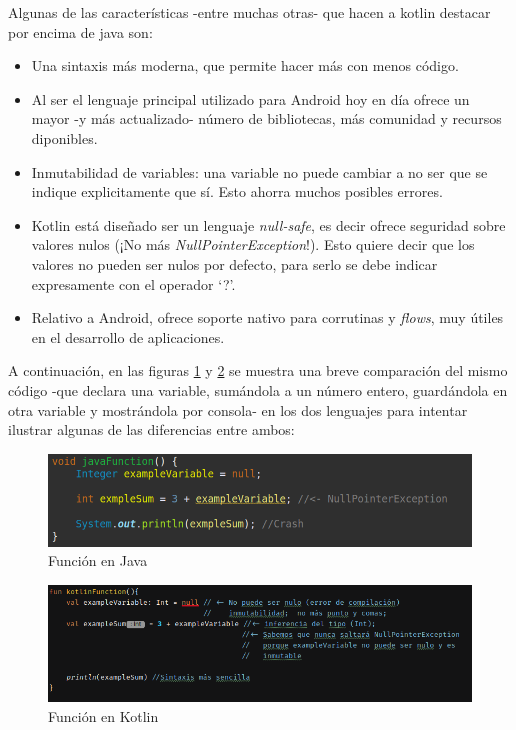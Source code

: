 Algunas de las características -entre muchas otras- que hacen a kotlin destacar por encima de java son:
\begin{itemize}
    \item Una sintaxis más moderna, que permite hacer más con menos código.
    \item Al ser el lenguaje principal utilizado para Android hoy en día ofrece un mayor -y más actualizado- número de bibliotecas, más comunidad y recursos diponibles.
    \item Inmutabilidad de variables: una variable no puede cambiar a no ser que se indique explicitamente que sí. Esto ahorra muchos posibles errores.
    \item Kotlin está diseñado ser un lenguaje \textit{null-safe}, es decir ofrece seguridad sobre valores nulos (¡No más \textit{NullPointerException}!). Esto quiere decir que los valores no pueden ser nulos por defecto, para serlo se debe indicar expresamente con el operador ‘?’.
    \item Relativo a Android, ofrece soporte nativo para corrutinas y \textit{flows}, muy útiles en el desarrollo de aplicaciones.
\end{itemize}
A continuación, en las figuras \ref{fig:javaFun} y \ref{fig:kotlinFun} se muestra una breve comparación del mismo código -que declara una variable, sumándola a un número entero, guardándola en otra variable y mostrándola por consola- en los dos lenguajes para intentar ilustrar algunas de las diferencias entre ambos:
\begin{figure}[h]
	\centering
	\includegraphics[width = 1\textwidth]{Imagenes/Fuentes/javaFun.png}
	\caption{Función en Java}
	\label{fig:javaFun}
\end{figure}
\begin{figure}[h]
	\centering
	\includegraphics[width = 1\textwidth]{Imagenes/Fuentes/kotlinFun.png}
	\caption{Función en Kotlin}
	\label{fig:kotlinFun}
\end{figure}

